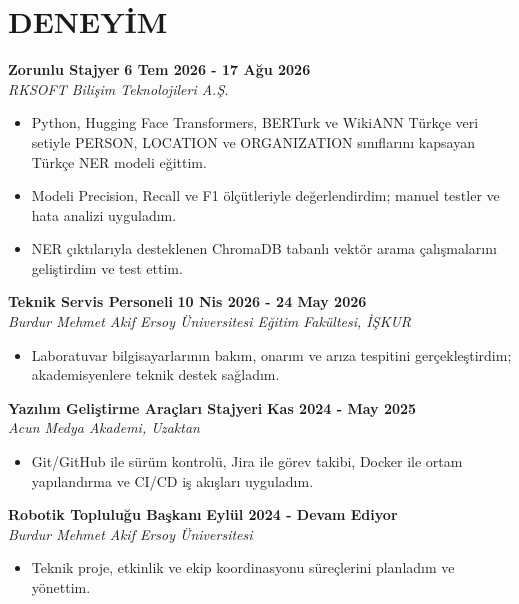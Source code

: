
\section{DENEYİM}

\textbf{Zorunlu Stajyer} \hfill \textbf{6 Tem 2026 - 17 Ağu 2026} \\
\textit{RKSOFT Bilişim Teknolojileri A.Ş.}
\begin{itemize}
    \item Python, Hugging Face Transformers, BERTurk ve WikiANN Türkçe veri setiyle PERSON, LOCATION ve ORGANIZATION sınıflarını kapsayan Türkçe NER modeli eğittim.
    \item Modeli Precision, Recall ve F1 ölçütleriyle değerlendirdim; manuel testler ve hata analizi uyguladım.
    \item NER çıktılarıyla desteklenen ChromaDB tabanlı vektör arama çalışmalarını geliştirdim ve test ettim.
\end{itemize}

\vspace{3pt}

\noindent \textbf{Teknik Servis Personeli} \hfill \textbf{10 Nis 2026 - 24 May 2026} \\
\textit{Burdur Mehmet Akif Ersoy Üniversitesi Eğitim Fakültesi, İŞKUR}
\begin{itemize}
    \item Laboratuvar bilgisayarlarının bakım, onarım ve arıza tespitini gerçekleştirdim; akademisyenlere teknik destek sağladım.
\end{itemize}

\vspace{3pt}

\noindent \textbf{Yazılım Geliştirme Araçları Stajyeri} \hfill \textbf{Kas 2024 - May 2025} \\
\textit{Acun Medya Akademi, Uzaktan}
\begin{itemize}
    \item Git/GitHub ile sürüm kontrolü, Jira ile görev takibi, Docker ile ortam yapılandırma ve CI/CD iş akışları uyguladım.
\end{itemize}

\vspace{3pt}

\noindent \textbf{Robotik Topluluğu Başkanı} \hfill \textbf{Eylül 2024 - Devam Ediyor} \\
\textit{Burdur Mehmet Akif Ersoy Üniversitesi}
\begin{itemize}
    \item Teknik proje, etkinlik ve ekip koordinasyonu süreçlerini planladım ve yönettim.
\end{itemize}
